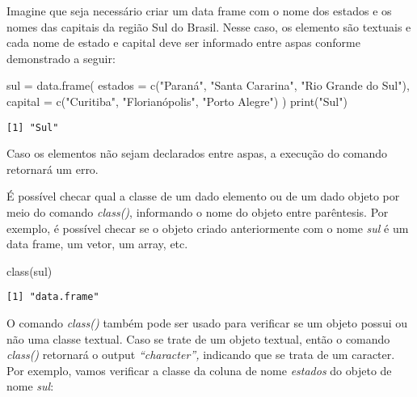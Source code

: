 \documentclass[
  letterpaper,
  DIV=11,
  numbers=noendperiod]{scrreprt}
\newenvironment{Shaded}{\begin{snugshade}}{\end{snugshade}}
\newcommand{\AttributeTok}[1]{\textcolor[rgb]{0.40,0.45,0.13}{#1}}
\newcommand{\FunctionTok}[1]{\textcolor[rgb]{0.28,0.35,0.67}{#1}}
\newcommand{\NormalTok}[1]{\textcolor[rgb]{0.00,0.23,0.31}{#1}}
\newcommand{\OtherTok}[1]{\textcolor[rgb]{0.00,0.23,0.31}{#1}}
\newcommand{\SpecialCharTok}[1]{\textcolor[rgb]{0.37,0.37,0.37}{#1}}
\newcommand{\StringTok}[1]{\textcolor[rgb]{0.13,0.47,0.30}{#1}}
\begin{document}
Imagine que seja necessário criar um data frame com o nome dos estados e
os nomes das capitais da região Sul do Brasil. Nesse caso, os elemento
são textuais e cada nome de estado e capital deve ser informado entre
aspas conforme demonstrado a seguir:

\begin{Shaded}
\begin{Highlighting}[]
\NormalTok{sul }\OtherTok{=} \FunctionTok{data.frame}\NormalTok{(}
  \AttributeTok{estados =} \FunctionTok{c}\NormalTok{(}\StringTok{"Paraná"}\NormalTok{, }\StringTok{"Santa Cararina"}\NormalTok{, }\StringTok{"Rio Grande do Sul"}\NormalTok{),}
  \AttributeTok{capital =} \FunctionTok{c}\NormalTok{(}\StringTok{"Curitiba"}\NormalTok{, }\StringTok{"Florianópolis"}\NormalTok{, }\StringTok{"Porto Alegre"}\NormalTok{)}
\NormalTok{)}
\FunctionTok{print}\NormalTok{(}\StringTok{"Sul"}\NormalTok{)}
\end{Highlighting}
\end{Shaded}

\begin{verbatim}
[1] "Sul"
\end{verbatim}

Caso os elementos não sejam declarados entre aspas, a execução do
comando retornará um erro.

É possível checar qual a classe de um dado elemento ou de um dado objeto
por meio do comando \emph{class()}, informando o nome do objeto entre
parêntesis. Por exemplo, é possível checar se o objeto criado
anteriormente com o nome \emph{sul} é um data frame, um vetor, um array,
etc.

\begin{Shaded}
\begin{Highlighting}[]
\FunctionTok{class}\NormalTok{(sul)}
\end{Highlighting}
\end{Shaded}

\begin{verbatim}
[1] "data.frame"
\end{verbatim}

O comando \emph{class()} também pode ser usado para verificar se um
objeto possui ou não uma classe textual. Caso se trate de um objeto
textual, então o comando \emph{class()} retornará o output
\emph{``character'',} indicando que se trata de um caracter. Por
exemplo, vamos verificar a classe da coluna de nome \emph{estados} do
objeto de nome \emph{sul}:

\begin{Shaded}
\end{Shaded}
\end{document}
